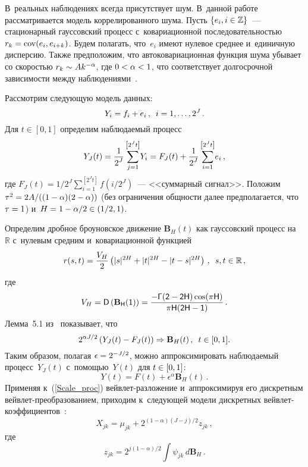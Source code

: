 \begin{multicols}{2}
В~реальных наблюдениях всегда присутствует шум. 
В~данной работе рас\-смат\-ри\-ва\-ет\-ся модель коррелированного шума. 
Пусть $\{e_i, i \hm\in \mathbb{Z}\}$~--- ста\-цио\-нар\-ный гауссовский процесс 
с~ковариационной по\-сле\-до\-ва\-тель\-ностью $r_k \hm= \cov (e_i,e_{i+k})$. Будем 
полагать, что~$e_i$ имеют нулевое сред\-нее и~единичную дис\-пер\-сию. 
Также предположим, что автоковариационная функция шума убывает со ско\-ростью 
$r_k \hm\sim Ak^{-\alpha}$, где $0 \hm< \alpha\hm <1$, что соответствует 
долгосрочной за\-ви\-си\-мости между наблюдениями~\cite{JS97}.

Рассмотрим следующую модель данных:
\begin{equation*}
Y_i = f_i + e_i\,, \enskip i = 1, \ldots, 2^J\,.
\end{equation*}
Для $t\in [0,1]$ определим наблюдаемый процесс
\begin{equation*}
Y_J(t) = \displaystyle\frac{\displaystyle 1\mathstrut}{\displaystyle 2^J\mathstrut} \sum\limits_{j=1}^{\left[2^Jt\right]} 
\!Y_i = F_J(t)+ \displaystyle\frac{\displaystyle 1\mathstrut}{\displaystyle 2^J\mathstrut} \sum\limits_{i=1}^{\left[2^Jt\right]}\! e_i\,,
\end{equation*}
где $F_J(t)=1/2^J \sum\nolimits_{i=1}^{\left[2^Jt\right]} f(i/2^J)$~--- <<суммарный сигнал>>. 
Положим $\tau^2 \hm= 2A/((1\hm-\alpha)(2\hm-\alpha))$ 
(без ограничения общ\-ности далее предполагается, что $\tau\hm=1$) и~$H \hm= 
1\hm- \alpha/2 \hm\in (1/2,1)$.

Определим дробное броуновское движение $\mathbf{B}_H(t)$ как
гауссовский процесс на~$\mathbb{R}$ с~нулевым средним  
и~ковариационной функцией
\begin{equation*}
r(s,t) = \displaystyle\frac{\displaystyle V_H\mathstrut}{\displaystyle 2\mathstrut}\left(|s|^{2H} + |t|^{2H} - |t-s|^{2H}\right)\,, \enskip
 s,t \in \mathbb{R}\,,
\end{equation*}
где
\begin{equation*}
V_H = \sf D \left(\mathbf{B}_H(1)\right) = 
\displaystyle\frac{\displaystyle -\Gamma(2-2H)\cos(\pi H)\mathstrut}{\displaystyle \pi H(2H-1)\mathstrut}\,.
\end{equation*}
Лемма~5.1 из~\cite{T75} показывает, что
\begin{equation*}
2^{\alpha J/2}\left(Y_J(t) - F_J(t)\right) 
\Rightarrow \mathbf{B}_H(t)\,, \enskip t\in[0,1].
\end{equation*}
Таким образом, полагая $\epsilon \hm= 2^{-J/2}$, можно аппроксимировать 
наблюдаемый процесс~$Y_J(t)$ с~по\-мощью~$Y(t)$ для $t \hm\in [0,1]$:
\begin{equation}
\label{Scale_proc}
Y(t) = F(t) + \epsilon^{\alpha} \mathbf{B}_H(t)\,.
\end{equation}
Применяя к~(\ref{Scale_proc}) вейв\-лет-раз\-ло\-же\-ние 
и~аппроксимируя его дискретным вейв\-лет-пре\-об\-ра\-зо\-ва\-ни\-ем, 
приходим к~сле\-ду\-ющей модели дискретных вейв\-лет-ко\-эф\-фи\-ци\-ен\-тов~\cite{JS97,J99}:
\begin{equation}
X_{jk} = \mu_{jk} +  2^{{(1-\alpha)(J-j)}/{2}} z_{jk}\,,
\label{Wav_LRD_model}
\end{equation}
где 
$$
z_{jk}=2^{{j(1-\alpha)}/{2}} \int \psi_{jk}\, d\mathbf{B}_H\,. 
$$


\end{multicols}
